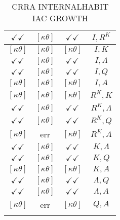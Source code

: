 \documentclass[a4paper,10pt]{article}
\begin{document}
\begin{longtable}{|c|c|c|c|}
\hline
$\checkmark\checkmark$ & $[\kappa \theta ]$ & $\checkmark\checkmark$ & ${I},{R^{K}}$ \\
\hline
$[\kappa \theta ]$ & $[\kappa \theta ]$ & $[\kappa \theta ]$ & ${I},{K}$ \\
\hline
$\checkmark\checkmark$ & $[\kappa \theta ]$ & $\checkmark\checkmark$ & ${I},{\Lambda}$ \\
\hline
$\checkmark\checkmark$ & $[\kappa \theta ]$ & $\checkmark\checkmark$ & ${I},{Q}$ \\
\hline
$[\kappa \theta ]$ & $[\kappa \theta ]$ & $[\kappa \theta ]$ & ${I},{A}$ \\
\hline
$[\kappa \theta ]$ & $[\kappa \theta ]$ & $[\kappa \theta ]$ & ${R^{K}},{K}$ \\
\hline
$\checkmark\checkmark$ & $[\kappa \theta ]$ & $\checkmark\checkmark$ & ${R^{K}},{\Lambda}$ \\
\hline
$\checkmark\checkmark$ & $[\kappa \theta ]$ & $\checkmark\checkmark$ & ${R^{K}},{Q}$ \\
\hline
$[\kappa \theta ]$ & err & $[\kappa \theta ]$ & ${R^{K}},{A}$ \\
\hline
$\checkmark\checkmark$ & $[\kappa \theta ]$ & $\checkmark\checkmark$ & ${K},{\Lambda}$ \\
\hline
$\checkmark\checkmark$ & $[\kappa \theta ]$ & $\checkmark\checkmark$ & ${K},{Q}$ \\
\hline
$[\kappa \theta ]$ & $[\kappa \theta ]$ & $[\kappa \theta ]$ & ${K},{A}$ \\
\hline
$\checkmark\checkmark$ & $[\kappa \theta ]$ & $\checkmark\checkmark$ & ${\Lambda},{Q}$ \\
\hline
$\checkmark\checkmark$ & $[\kappa \theta ]$ & $\checkmark\checkmark$ & ${\Lambda},{A}$ \\
\hline
$[\kappa \theta ]$ & err & $[\kappa \theta ]$ & ${Q},{A}$ \\
\hline
\caption{CRRA INTERNALHABIT IAC GROWTH}
\label{table:MyTableLabel}
\end{longtable}
\end{document}
